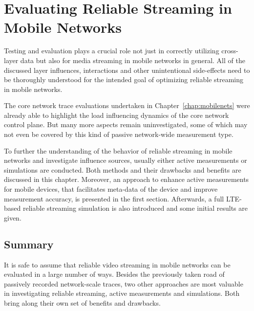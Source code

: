 \chapter{Evaluating Reliable Streaming in Mobile Networks}
\label{chap:mobilestreaming-measurements}

Testing and evaluation plays a crucial role not just in correctly utilizing cross-layer data but also for media streaming in mobile networks in general. All of the discussed layer influences, interactions and other unintentional side-effects need to be thoroughly understood for the intended goal of optimizing reliable streaming in mobile networks.

The core network trace evaluations undertaken in Chapter~\ref{chap:mobilenets} were already able to highlight the load influencing dynamics of the core network control plane. But many more aspects remain uninvestigated, some of which may not even be covered by this kind of passive network-wide measurement type.

To further the understanding of the behavior of reliable streaming in mobile networks and investigate influence sources, usually either active measurements or simulations are conducted. Both methods and their drawbacks and benefits are discussed in this chapter. Moreover, an approach to enhance active measurements for mobile devices, that facilitates meta-data of the device and improve measurement accuracy, is presented in the first section. Afterwards, a full \gls{LTE}-based reliable streaming simulation is also introduced and some initial results are given.







\section{Summary}

It is safe to assume that reliable video streaming in mobile networks can be evaluated in a large number of ways. Besides the previously taken road of passively recorded network-scale traces, two other approaches are most valuable in investigating reliable streaming, active measurements and simulations. Both bring along their own set of benefits and drawbacks. 

